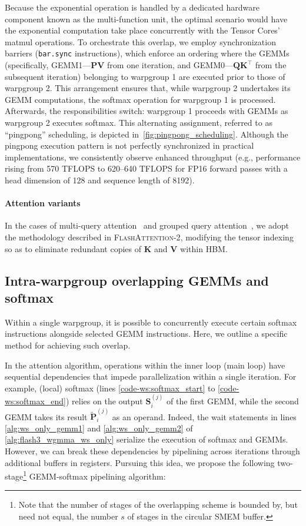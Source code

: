 Because the exponential operation is handled by a dedicated hardware component known as the multi-function unit, the optimal scenario would have the exponential computation take place concurrently with the Tensor Cores’ matmul operations. To orchestrate this overlap, we employ synchronization barriers (\texttt{bar.sync} instructions), which enforce an ordering where the GEMMs (specifically, GEMM1—$\mathbf{P} \mathbf{V}$ from one iteration, and GEMM0—$\mathbf{Q} \mathbf{K}^\top$ from the subsequent iteration) belonging to warpgroup 1 are executed prior to those of warpgroup 2. This arrangement ensures that, while warpgroup 2 undertakes its GEMM computations, the softmax operation for warpgroup 1 is processed. Afterwards, the responsibilities switch: warpgroup 1 proceeds with GEMMs as warpgroup 2 executes softmax. This alternating assignment, referred to as “pingpong” scheduling, is depicted in~\cref{fig:pingpong_scheduling}. Although the pingpong execution pattern is not perfectly synchronized in practical implementations, we consistently observe enhanced throughput (e.g., performance rising from 570 TFLOPS to 620–640 TFLOPS for FP16 forward passes with a head dimension of 128 and sequence length of 8192).

\paragraph{Attention variants} In the cases of multi-query attention~\citep{shazeer2019fast} and grouped query attention~\citep{ainslie2023gqa}, we adopt the methodology described in \textsc{FlashAttention-2}, modifying the tensor indexing so as to eliminate redundant copies of $\mathbf{K}$ and $\mathbf{V}$ within HBM.

\subsection{Intra-warpgroup overlapping GEMMs and softmax}

Within a single warpgroup, it is possible to concurrently execute certain softmax instructions alongside selected GEMM instructions. Here, we outline a specific method for achieving such overlap.

In the attention algorithm, operations within the inner loop (main loop) have sequential dependencies that impede parallelization within a single iteration. For example, (local) softmax (lines \ref{code-ws:softmax_start} to \ref{code-ws:softmax_end}) relies on the output $\mathbf{S}_i^{(j)}$ of the first GEMM, while the second GEMM takes its result $\widetilde{\mathbf{P}}_i^{(j)}$ as an operand. Indeed, the wait statements in lines \ref{alg:ws_only_gemm1} and \ref{alg:ws_only_gemm2} of \cref{alg:flash3_wgmma_ws_only} serialize the execution of softmax and GEMMs. However, we can break these dependencies by pipelining across iterations through additional buffers in registers. Pursuing this idea, we propose the following two-stage\footnote{Note that the number of stages of the overlapping scheme is bounded by, but need not equal, the number $s$ of stages in the circular SMEM buffer.} GEMM-softmax pipelining algorithm:

